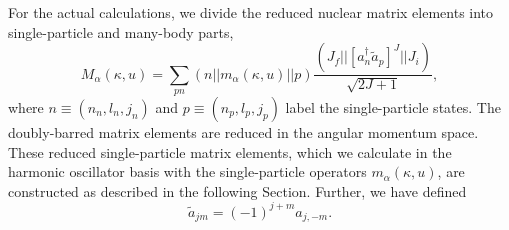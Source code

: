 For the actual calculations, we divide the reduced nuclear matrix elements 
into single-particle and many-body parts,
\begin{equation}\label{obtd}
  M_\alpha(\kappa,u) = \sum_{pn}(n||m_\alpha(\kappa,u)||p)
  \frac{(J_f||[a^\dagger_n\tilde a_p]^J|| J_i)}{\sqrt{2J+1}},
\end{equation}
where $n\equiv(n_n,l_n,j_n)$ and $p\equiv(n_p,l_p,j_p)$ label the 
single-particle states. The doubly-barred
matrix elements are reduced in the angular momentum space. These reduced
single-particle matrix elements, which we calculate in the harmonic
oscillator basis with the single-particle operators $m_\alpha
(\kappa,u)$, are constructed as described 
in the following Section. Further, we have defined
\begin{equation}\label{atilde}
  \tilde a_{jm}=(-1)^{j+m}a_{j,-m}.
\end{equation}

